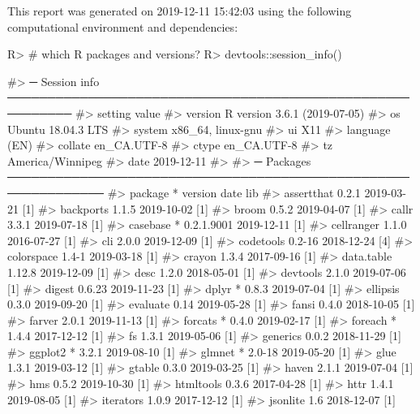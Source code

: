 \documentclass[
]{jss}
\begin{document}
This report was generated on 2019-12-11 15:42:03 using the following
computational environment and dependencies:

\begin{CodeChunk}

\begin{CodeInput}
R> # which R packages and versions?
R> devtools::session_info()
\end{CodeInput}

\begin{CodeOutput}
#> ─ Session info ──────────────────────────────────────────────────────────
#>  setting  value                       
#>  version  R version 3.6.1 (2019-07-05)
#>  os       Ubuntu 18.04.3 LTS          
#>  system   x86_64, linux-gnu           
#>  ui       X11                         
#>  language (EN)                        
#>  collate  en_CA.UTF-8                 
#>  ctype    en_CA.UTF-8                 
#>  tz       America/Winnipeg            
#>  date     2019-12-11                  
#> 
#> ─ Packages ──────────────────────────────────────────────────────────────
#>  package     * version    date       lib
#>  assertthat    0.2.1      2019-03-21 [1]
#>  backports     1.1.5      2019-10-02 [1]
#>  broom         0.5.2      2019-04-07 [1]
#>  callr         3.3.1      2019-07-18 [1]
#>  casebase    * 0.2.1.9001 2019-12-11 [1]
#>  cellranger    1.1.0      2016-07-27 [1]
#>  cli           2.0.0      2019-12-09 [1]
#>  codetools     0.2-16     2018-12-24 [4]
#>  colorspace    1.4-1      2019-03-18 [1]
#>  crayon        1.3.4      2017-09-16 [1]
#>  data.table    1.12.8     2019-12-09 [1]
#>  desc          1.2.0      2018-05-01 [1]
#>  devtools      2.1.0      2019-07-06 [1]
#>  digest        0.6.23     2019-11-23 [1]
#>  dplyr       * 0.8.3      2019-07-04 [1]
#>  ellipsis      0.3.0      2019-09-20 [1]
#>  evaluate      0.14       2019-05-28 [1]
#>  fansi         0.4.0      2018-10-05 [1]
#>  farver        2.0.1      2019-11-13 [1]
#>  forcats     * 0.4.0      2019-02-17 [1]
#>  foreach     * 1.4.4      2017-12-12 [1]
#>  fs            1.3.1      2019-05-06 [1]
#>  generics      0.0.2      2018-11-29 [1]
#>  ggplot2     * 3.2.1      2019-08-10 [1]
#>  glmnet      * 2.0-18     2019-05-20 [1]
#>  glue          1.3.1      2019-03-12 [1]
#>  gtable        0.3.0      2019-03-25 [1]
#>  haven         2.1.1      2019-07-04 [1]
#>  hms           0.5.2      2019-10-30 [1]
#>  htmltools     0.3.6      2017-04-28 [1]
#>  httr          1.4.1      2019-08-05 [1]
#>  iterators     1.0.9      2017-12-12 [1]
#>  jsonlite      1.6        2018-12-07 [1]

\end{CodeOutput}
\end{CodeChunk}
\end{document}
